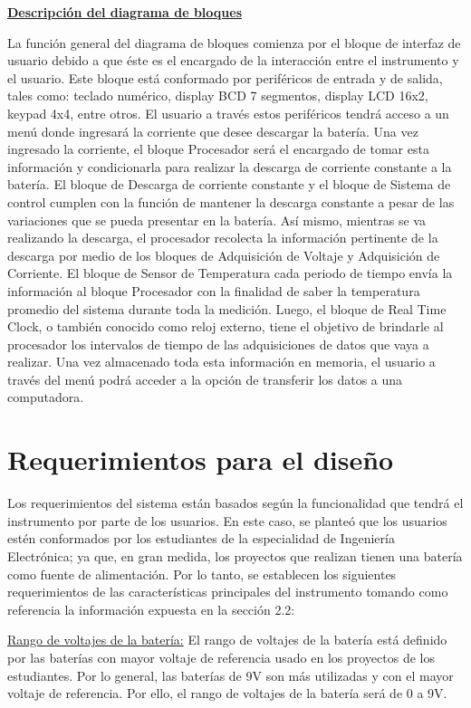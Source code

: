 \textbf{\underline{Descripción del diagrama de bloques}}

La función general del diagrama de bloques comienza por el bloque de interfaz de usuario debido a que éste es el encargado de la interacción entre el instrumento y el usuario. Este bloque está conformado por periféricos de entrada y de salida, tales como: teclado numérico, display BCD 7 segmentos, display LCD 16x2, keypad 4x4, entre otros. El usuario a través estos periféricos tendrá acceso a un menú donde ingresará la corriente que desee descargar la batería. Una vez ingresado la corriente, el bloque Procesador será el encargado de tomar esta información y condicionarla para realizar la descarga de corriente constante a la batería. El bloque de Descarga de corriente constante y el bloque de Sistema de control cumplen con la función de mantener la descarga constante a pesar de las variaciones que se pueda presentar en la batería. Así mismo, mientras se va realizando la descarga, el procesador recolecta la información pertinente de la descarga por medio de los bloques de Adquisición de Voltaje y Adquisición de Corriente. El bloque de Sensor de Temperatura cada periodo de tiempo envía la información al bloque Procesador con la finalidad de saber la temperatura promedio del sistema durante toda la medición. Luego, el bloque de Real Time Clock, o también conocido como reloj externo, tiene el objetivo de brindarle al procesador los intervalos de tiempo de las adquisiciones de datos que vaya a realizar. Una vez almacenado toda esta información en memoria, el usuario a través del menú podrá acceder a la opción de transferir los datos a una computadora. 

\section{Requerimientos para el diseño}

Los requerimientos del sistema están basados según la funcionalidad que tendrá el instrumento por parte de los usuarios. En este caso, se planteó que los usuarios estén conformados por los estudiantes de la especialidad de Ingeniería Electrónica; ya que, en gran medida, los proyectos que realizan tienen una batería como fuente de alimentación. Por lo tanto, se establecen los siguientes requerimientos de las características principales del instrumento tomando como referencia la información expuesta en la sección 2.2:

\underline{Rango de voltajes de la batería:} El rango de voltajes de la batería está definido por las baterías con mayor voltaje de referencia usado en los proyectos de los estudiantes. Por lo general, las baterías de 9V son más utilizadas y con el mayor voltaje de referencia. Por ello, el rango de voltajes de la batería será de 0 a 9V.

